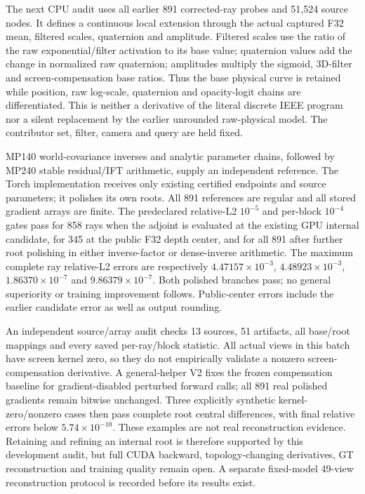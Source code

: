 \documentclass[11pt,a4paper]{article}
\begin{document}
The next CPU audit uses all earlier 891 corrected-ray probes and 51,524
source nodes. It defines a continuous local extension through the actual
captured F32 mean, filtered scales, quaternion and amplitude. Filtered
scales use the ratio of the raw exponential/filter activation to its base
value; quaternion values add the change in normalized raw quaternion;
amplitudes multiply the sigmoid, 3D-filter and screen-compensation base
ratios. Thus the base physical curve is retained while position, raw
log-scale, quaternion and opacity-logit chains are differentiated. This
is neither a derivative of the literal discrete IEEE program nor a
silent replacement by the earlier unrounded raw-physical model.
The contributor set, filter, camera and query are held fixed.

MP140 world-covariance inverses and analytic parameter chains, followed
by MP240 stable residual/IFT arithmetic, supply an independent reference.
The Torch implementation receives only existing certified endpoints and
source parameters; it polishes its own roots. All 891 references are
regular and all stored gradient arrays are finite. The predeclared
relative-L2 $10^{-5}$ and per-block $10^{-4}$ gates pass for 858 rays when
the adjoint is evaluated at the existing GPU internal candidate, for 345
at the public F32 depth center, and for all 891 after further root polishing
in either inverse-factor or dense-inverse arithmetic. The maximum complete
ray relative-L2 errors are respectively $4.47157\times10^{-3}$,
$4.48923\times10^{-3}$, $1.86370\times10^{-7}$ and
$9.86379\times10^{-7}$. Both polished branches pass; no general superiority
or training improvement follows. Public-center errors include the earlier
candidate error as well as output rounding.

An independent source/array audit checks 13 sources, 51 artifacts,
all base/root mappings and every saved per-ray/block statistic. All actual
views in this batch have screen kernel zero, so they do not empirically
validate a nonzero screen-compensation derivative. A general-helper V2
fixes the frozen compensation baseline for gradient-disabled perturbed
forward calls; all 891 real polished gradients remain bitwise unchanged.
Three explicitly synthetic kernel-zero/nonzero cases then pass complete
root central differences, with final relative errors below
$5.74\times10^{-10}$. These examples are not real reconstruction evidence.
Retaining and refining an internal root is therefore supported by this
development audit, but full CUDA backward, topology-changing derivatives,
GT reconstruction and training quality remain open. A separate fixed-model
49-view reconstruction protocol is recorded before its results exist.
\end{document}

